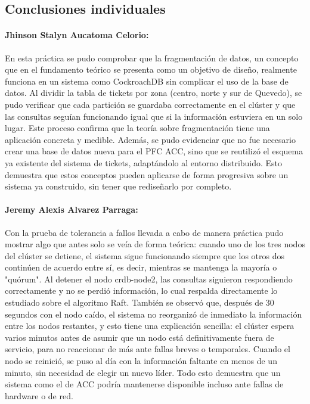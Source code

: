 \documentclass[11pt,a4paper]{article}
\begin{document}
\subsection*{Conclusiones individuales}

\paragraph{Jhinson Stalyn Aucatoma Celorio:} En esta práctica se pudo comprobar que la fragmentación de datos, un concepto que en el fundamento teórico se presenta como un objetivo de diseño, realmente funciona en un sistema como CockroachDB sin complicar el uso de la base de datos. Al dividir la tabla de tickets por zona (centro, norte y sur de Quevedo), se pudo verificar que cada partición se guardaba correctamente en el clúster y que las consultas seguían funcionando igual que si la información estuviera en un solo lugar. Este proceso confirma que la teoría sobre fragmentación tiene una aplicación concreta y medible. Además, se pudo evidenciar que no fue necesario crear una base de datos nueva para el PFC ACC, sino que se reutilizó el esquema ya existente del sistema de tickets, adaptándolo al entorno distribuido. Esto demuestra que estos conceptos pueden aplicarse de forma progresiva sobre un sistema ya construido, sin tener que rediseñarlo por completo.

\paragraph{Jeremy Alexis Alvarez Parraga:} Con la prueba de tolerancia a fallos llevada a cabo de manera práctica pudo mostrar algo que antes solo se veía de forma teórica: cuando uno de los tres nodos del clúster se detiene, el sistema sigue funcionando siempre que los otros dos continúen de acuerdo entre sí, es decir, mientras se mantenga la mayoría o "quórum". Al detener el nodo crdb-node2, las consultas siguieron respondiendo correctamente y no se perdió información, lo cual respalda directamente lo estudiado sobre el algoritmo Raft. También se observó que, después de 30 segundos con el nodo caído, el sistema no reorganizó de inmediato la información entre los nodos restantes, y esto tiene una explicación sencilla: el clúster espera varios minutos antes de asumir que un nodo está definitivamente fuera de servicio, para no reaccionar de más ante fallas breves o temporales. Cuando el nodo se reinició, se puso al día con la información faltante en menos de un minuto, sin necesidad de elegir un nuevo líder. Todo esto demuestra que un sistema como el de ACC podría mantenerse disponible incluso ante fallas de hardware o de red.
\end{document}
